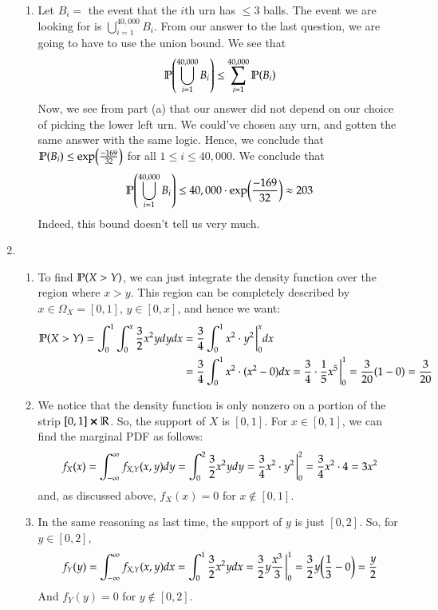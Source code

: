 \documentclass[12pt]{article}
\theoremstyle{definitionstyle}
\def\mbb#1{\mathbb{#1}}
\def \R{\mbb{R}}
\renewcommand{\P}{\mathbb{P}\qty}
\renewcommand{\inf}{\infty}
\begin{document}
\begin{enumerate}[leftmargin=\labelsep]
\begin{enumerate}
			\item Let $B_i = $ the event that the $i$th urn has $\leq 3$ balls. The event we are looking for is $\bigcup_{i=1}^{40,000} B_i$. From our answer to the last question, we are going to have to use the union bound. We see that
			\begin{align*}
				\P(\bigcup_{i=1}^{40,000} B_i) \leq \sum_{i=1}^{40,000} \P(B_i)
			\end{align*}
			Now, we see from part (a) that our answer did not depend on our choice of picking the lower left urn. We could've chosen any urn, and gotten the same answer with the same logic. Hence, we conclude that $\P(B_i) \leq \exp(\frac{-169}{32})$ for all $1 \leq i \leq 40,000$. We conclude that
			\begin{align*}
				\P(\bigcup_{i=1}^{40,000} B_i) \leq 40,000 \cdot \exp(\frac{-169}{32}) \approx 203
			\end{align*}
			Indeed, this bound doesn't tell us very much.
		\end{enumerate}
	
		\newpage
		\item \begin{enumerate}
			\item To find $\P(X > Y)$, we can just integrate the density function over the region where $x > y$. This region can be completely described by $x \in \Omega_X = [0, 1]$, $y \in [0, x]$, and hence we want:
			\begin{align*}
				\P(X > Y) = \int_0^1 \int_0^x \frac32 x^2ydydx &= \frac34 \int_0^1 x^2 \cdot y^2\eval_0^x dx \\ &= \frac34 \int_0^1 x^2 \cdot (x^2-0)dx = \frac34 \cdot \frac15 x^5 \eval_0^1 = \frac3{20} (1 - 0) = \frac3{20}
			\end{align*}
			\item We notice that the density function is only nonzero on a portion of the strip $[0, 1] \cross \R$. So, the support of $X$ is $[0, 1]$. For $x \in [0, 1]$, we can find the marginal PDF as follows:
			\begin{align*}
				f_X(x) = \int_{-\infty}^\infty f_{X,Y}(x,y)dy = \int_0^2 \frac32 x^2ydy = \frac34 x^2 \cdot y^2\eval_0^2 = \frac34x^2 \cdot 4 = 3x^2
			\end{align*}
			and, as discussed above, $f_X(x) = 0$ for $x \not \in [0, 1]$.
			
			\item In the same reasoning as last time, the support of $y$ is just $[0, 2]$. So, for $y \in [0, 2]$, 
			\begin{align*}
				f_Y(y) = \int_{-\inf}^\inf f_{X,Y}(x,y)dx = \int_0^1 \frac32 x^2ydx = \frac32 y \frac{x^3}{3} \eval_0^1 = \frac32 y \qty(\frac13 - 0) = \frac y2
			\end{align*}
			And $f_Y(y) = 0$ for $y \not \in [0, 2]$.
			

\end{enumerate}
\end{enumerate}
\end{document}
